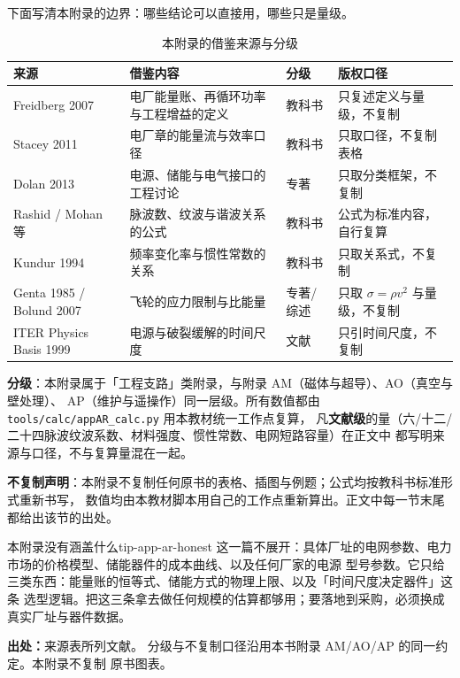 \begingroup\small
下面写清本附录的边界：哪些结论可以直接用，哪些只是量级。

\begin{table}[htbp]
\centering
\small
\caption{本附录的借鉴来源与分级}
\label{tab:app-ar-source}
\begin{tabular}{p{2.9cm}p{4.2cm}p{2.0cm}p{4.4cm}}
\hline
来源 & 借鉴内容 & 分级 & 版权口径 \\
\hline
Freidberg 2007 & 电厂能量账、再循环功率与工程增益的定义 & 教科书 & 只复述定义与量级，不复制 \\
Stacey 2011 & 电厂章的能量流与效率口径 & 教科书 & 只取口径，不复制表格 \\
Dolan 2013 & 电源、储能与电气接口的工程讨论 & 专著 & 只取分类框架，不复制 \\
Rashid / Mohan 等 & 脉波数、纹波与谐波关系的公式 & 教科书 & 公式为标准内容，自行复算 \\
Kundur 1994 & 频率变化率与惯性常数的关系 & 教科书 & 只取关系式，不复制 \\
Genta 1985 / Bolund 2007 & 飞轮的应力限制与比能量 & 专著/综述 & 只取 $\sigma=\rho v^2$ 与量级，不复制 \\
ITER Physics Basis 1999 & 电源与破裂缓解的时间尺度 & 文献 & 只引时间尺度，不复制 \\
\hline
\end{tabular}
\end{table}

\textbf{分级}：本附录属于「工程支路」类附录，与附录 AM（磁体与超导）、AO（真空与壁处理）、
AP（维护与遥操作）同一层级。所有数值都由 \texttt{tools/\allowbreak{}calc/\allowbreak{}appAR\_calc.py} 用本教材统一工作点复算，
凡\textbf{文献级}的量（六/十二/二十四脉波纹波系数、材料强度、惯性常数、电网短路容量）在正文中
都写明来源与口径，不与复算量混在一起。

\textbf{不复制声明}：本附录不复制任何原书的表格、插图与例题；公式均按教科书标准形式重新书写，
数值均由本教材脚本用自己的工作点重新算出。正文中每一节末尾都给出该节的出处。

\begin{tip}{本附录没有涵盖什么}{tip-app-ar-honest}
这一篇不展开：具体厂址的电网参数、电力市场的价格模型、储能器件的成本曲线、以及任何厂家的电源
型号参数。它只给三类东西：能量账的恒等式、储能方式的物理上限、以及「时间尺度决定器件」这条
选型逻辑。把这三条拿去做任何规模的估算都够用；要落地到采购，必须换成真实厂址与器件数据。
\end{tip}


\textbf{出处：}来源表所列文献。
分级与不复制口径沿用本书附录 AM/AO/AP 的同一约定。本附录不复制
原书图表。
\endgroup